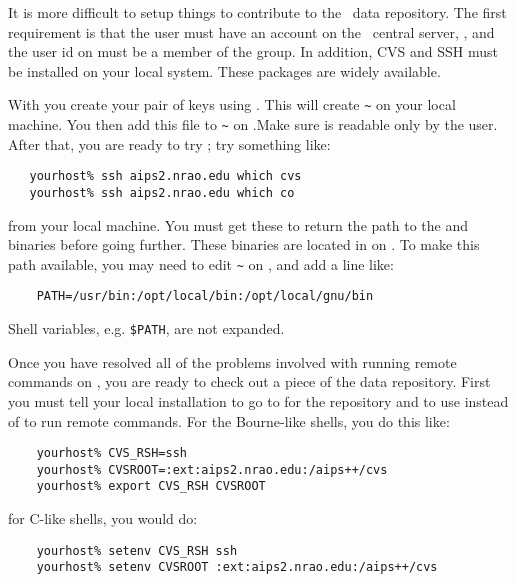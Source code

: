 It is more difficult to setup things to contribute to the \aipspp\ data
repository. The first requirement is that the user must have an account
on the \aipspp\ central server, , and the user id on
 must be a member of the  group.
In addition, CVS and SSH must be installed on your local system. These
packages are widely available.

With  you create your pair of keys using .
This will create \verb+~+ on your local machine. You then
add this file to \verb+~+ on .Make
sure  is readable only by the user. After that, you
are ready to try ; try something like:

\begin{verbatim}
   yourhost% ssh aips2.nrao.edu which cvs
   yourhost% ssh aips2.nrao.edu which co
\end{verbatim}

\noindent
from your local machine. You must get these to return the path to the
 and  binaries before going further. These binaries
are located in  on . To make
this path available, you may need to edit \verb+~+ on
, and add a line like:

\begin{verbatim}
    PATH=/usr/bin:/opt/local/bin:/opt/local/gnu/bin
\end{verbatim}

\noindent
Shell variables, e.g. \verb+$PATH+, are not expanded.

Once you have resolved all of the problems involved with running remote
commands on , you are ready to check out a piece
of the data repository. First you must tell your local 
installation to go to  for the repository and to
use  instead of  to run remote commands. For
the Bourne-like shells, you do this like:

\begin{verbatim}
    yourhost% CVS_RSH=ssh
    yourhost% CVSROOT=:ext:aips2.nrao.edu:/aips++/cvs
    yourhost% export CVS_RSH CVSROOT
\end{verbatim}

\noindent
for C-like shells, you would do:

\begin{verbatim}
    yourhost% setenv CVS_RSH ssh
    yourhost% setenv CVSROOT :ext:aips2.nrao.edu:/aips++/cvs
\end{verbatim}

